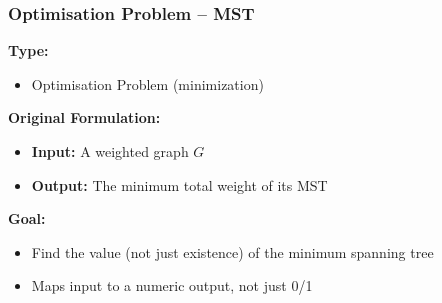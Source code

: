 \documentclass[10pt,aspectratio=43]{beamer}
\begin{document}
\begin{frame}
  \frametitle{Optimisation Problem – MST}
  
  \textbf{Type:}
  \begin{itemize}
      \item Optimisation Problem (minimization)
  \end{itemize}
  
  \vspace{0.3cm}
  
  \textbf{Original Formulation:}
  \begin{itemize}
      \item \textbf{Input:} A weighted graph $G$
      \vspace{3pt}
      \item \textbf{Output:} The minimum total weight of its MST
  \end{itemize}
  
  \vspace{0.3cm}
  
  \textbf{Goal:}
  \begin{itemize}
      \item Find the value (not just existence) of the minimum spanning tree
      \vspace{3pt}
      \item Maps input to a numeric output, not just 0/1
  \end{itemize}
\end{frame}
\end{document}
